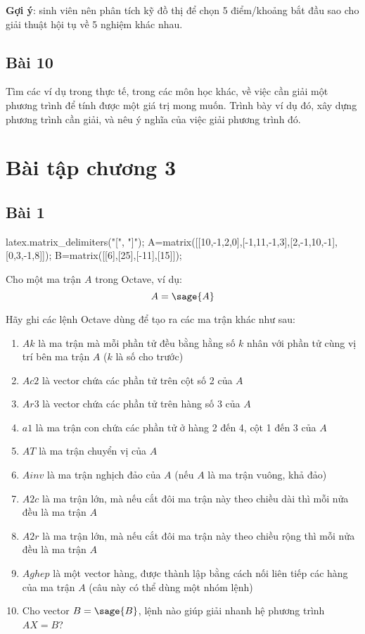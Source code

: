 \documentclass[12pt]{article}
\begin{document}
\textbf{Gợi ý}: sinh viên nên phân tích kỹ đồ thị để chọn 5 điểm/khoảng bắt đầu sao cho giải thuật hội tụ về 5 nghiệm khác nhau.

\subsection{Bài 10}
Tìm các ví dụ trong thực tế, trong các môn học khác, về việc cần giải một phương trình để tính được một giá trị mong muốn. Trình bày ví dụ đó, xây dựng phương trình cần giải, và nêu ý nghĩa của việc giải phương trình đó.

\section{Bài tập chương 3}

\subsection{Bài 1}
\begin{sagesilent}
latex.matrix_delimiters("[", "]");
A=matrix([[10,-1,2,0],[-1,11,-1,3],[2,-1,10,-1],[0,3,-1,8]]);
B=matrix([[6],[25],[-11],[15]]);
\end{sagesilent}

Cho một ma trận $A$ trong Octave, ví dụ:
\begin{equation}
 A=\sage{A}
\end{equation}

Hãy ghi các lệnh Octave dùng để tạo ra các ma trận khác như sau:
\begin{enumerate}
 \item $Ak$ là ma trận mà mỗi phần tử đều bằng hằng số $k$ nhân với phần tử cùng vị trí bên ma trận $A$ ($k$ là số cho trước)
 \item $Ac2$ là vector chứa các phần tử trên cột số 2 của $A$
 \item $Ar3$ là vector chứa các phần tử trên hàng số 3 của $A$
 \item $a1$ là ma trận con chứa các phần tử ở hàng 2 đến 4, cột 1 đến 3 của $A$
 \item $AT$ là ma trận chuyển vị của $A$
 \item $Ainv$ là ma trận nghịch đảo của $A$ (nếu $A$ là ma trận vuông, khả đảo)
 \item $A2c$ là ma trận lớn, mà nếu cắt đôi ma trận này theo chiều dài thì mỗi nửa đều là ma trận $A$
 \item $A2r$ là ma trận lớn, mà nếu cắt đôi ma trận này theo chiều rộng thì mỗi nửa đều là ma trận $A$
 \item $Aghep$ là một vector hàng, được thành lập bằng cách nối liên tiếp các hàng của ma trận $A$ (câu này có thể dùng một nhóm lệnh)
 \item Cho vector $B=\sage{B}$, lệnh nào giúp giải nhanh hệ phương trình $AX=B$?
\end{enumerate}
\end{document}

